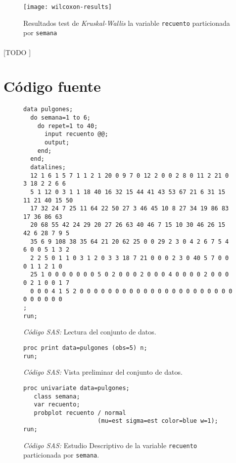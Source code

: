 \documentclass[11pt]{article}
\begin{document}
      \begin{figure}[!h]
        \centering
        \texttt{[image: wilcoxon-results]}
        \caption{Resultados test de \emph{Kruskal-Wallis} la variable \texttt{recuento} particionada por \texttt{semana}}
        \label{img:anova-recuento-log}
      \end{figure}

      \paragraph{}
      [TODO ]

  \section{Código fuente}
  \label{sec:code}

    \begin{figure}[!h]
      \centering
      \begin{verbatim}
data pulgones;
  do semana=1 to 6;
    do repet=1 to 40;
      input recuento @@;
      output;
    end;
  end;
  datalines;
  12 1 6 1 5 7 1 1 2 1 20 0 9 7 0 12 2 0 0 2 8 0 11 2 21 0 3 18 2 2 6 6
  5 1 12 0 3 1 1 18 40 16 32 15 44 41 43 53 67 21 6 31 15 11 21 40 15 50
  17 32 24 7 25 11 64 22 50 27 3 46 45 10 8 27 34 19 86 83 17 36 86 63
  20 68 55 42 24 29 20 27 26 63 40 46 7 15 10 30 46 26 15 42 6 28 7 9 5
  35 6 9 108 38 35 64 21 20 62 25 0 0 29 2 3 0 4 2 6 7 5 4 6 0 0 5 1 3 2
  2 2 5 0 1 1 0 3 1 2 0 3 3 18 7 21 0 0 0 2 3 0 40 5 7 0 0 0 1 1 2 1 0
  25 1 0 0 0 0 0 0 0 5 0 2 0 0 0 2 0 0 0 4 0 0 0 0 2 0 0 0 0 2 1 0 0 1 7
  0 0 0 4 1 5 2 0 0 0 0 0 0 0 0 0 0 0 0 0 0 0 0 0 0 0 0 0 0 0 0 0 0 0 0
;
run;
      \end{verbatim}
      \caption{\emph{Código SAS:} Lectura del conjunto de datos.}
      \label{code:sas_1}
    \end{figure}


    \begin{figure}[!h]
      \centering
      \begin{verbatim}
proc print data=pulgones (obs=5) n;
run;
      \end{verbatim}
      \caption{\emph{Código SAS:} Vista preliminar del conjunto de datos.}
      \label{code:sas_2}
    \end{figure}

    \begin{figure}[!h]
      \centering
      \begin{verbatim}
proc univariate data=pulgones;
   class semana;
   var recuento;
   probplot recuento / normal
                     (mu=est sigma=est color=blue w=1);
run;
      \end{verbatim}
      \caption{\emph{Código SAS:} Estudio Descriptivo de la variable \texttt{recuento} particionada por \texttt{semana}.}
      \label{code:sas_3}
    \end{figure}
\end{document}
